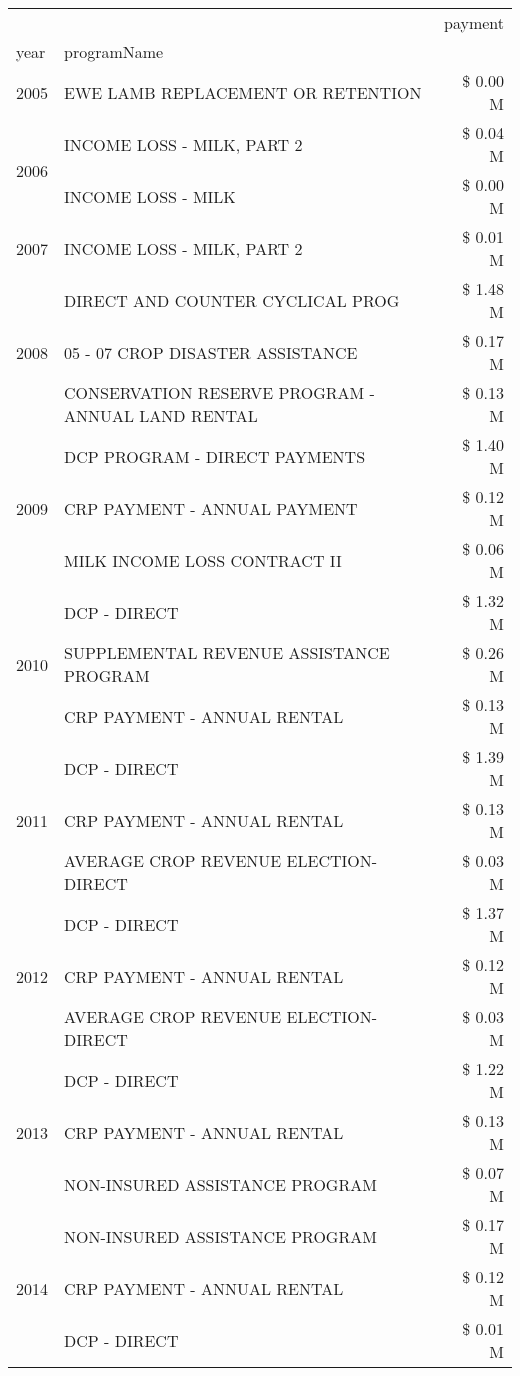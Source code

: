 \begin{tabular}{llr}
\toprule
 &  & payment \\
year & programName &  \\
\midrule
2005 & EWE LAMB REPLACEMENT OR RETENTION & \$ 0.00 M \\
\cline{1-3}
\multirow[t]{2}{*}{2006} & INCOME LOSS - MILK, PART 2 & \$ 0.04 M \\
 & INCOME LOSS - MILK & \$ 0.00 M \\
\cline{1-3}
2007 & INCOME LOSS - MILK, PART 2 & \$ 0.01 M \\
\cline{1-3}
\multirow[t]{3}{*}{2008} & DIRECT AND COUNTER CYCLICAL PROG & \$ 1.48 M \\
 & 05 - 07 CROP DISASTER ASSISTANCE & \$ 0.17 M \\
 & CONSERVATION RESERVE PROGRAM - ANNUAL LAND RENTAL & \$ 0.13 M \\
\cline{1-3}
\multirow[t]{3}{*}{2009} & DCP PROGRAM - DIRECT PAYMENTS & \$ 1.40 M \\
 & CRP PAYMENT - ANNUAL PAYMENT & \$ 0.12 M \\
 & MILK INCOME LOSS CONTRACT II & \$ 0.06 M \\
\cline{1-3}
\multirow[t]{3}{*}{2010} & DCP - DIRECT & \$ 1.32 M \\
 & SUPPLEMENTAL REVENUE ASSISTANCE PROGRAM & \$ 0.26 M \\
 & CRP PAYMENT - ANNUAL RENTAL & \$ 0.13 M \\
\cline{1-3}
\multirow[t]{3}{*}{2011} & DCP - DIRECT & \$ 1.39 M \\
 & CRP PAYMENT - ANNUAL RENTAL & \$ 0.13 M \\
 & AVERAGE CROP REVENUE ELECTION-DIRECT & \$ 0.03 M \\
\cline{1-3}
\multirow[t]{3}{*}{2012} & DCP - DIRECT & \$ 1.37 M \\
 & CRP PAYMENT - ANNUAL RENTAL & \$ 0.12 M \\
 & AVERAGE CROP REVENUE ELECTION-DIRECT & \$ 0.03 M \\
\cline{1-3}
\multirow[t]{3}{*}{2013} & DCP - DIRECT & \$ 1.22 M \\
 & CRP PAYMENT - ANNUAL RENTAL & \$ 0.13 M \\
 & NON-INSURED ASSISTANCE PROGRAM & \$ 0.07 M \\
\cline{1-3}
\multirow[t]{3}{*}{2014} & NON-INSURED ASSISTANCE PROGRAM & \$ 0.17 M \\
 & CRP PAYMENT - ANNUAL RENTAL & \$ 0.12 M \\
 & DCP - DIRECT & \$ 0.01 M \\

\end{tabular}
